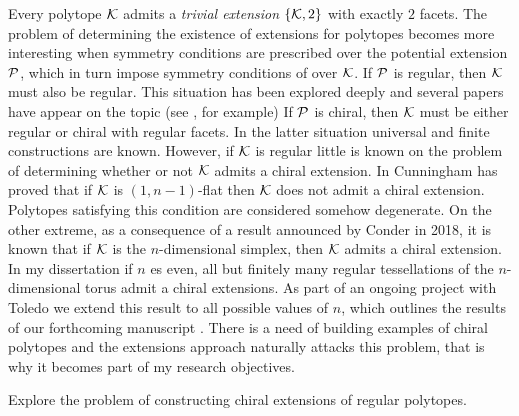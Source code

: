 \documentclass[a4paper,12pt,english]{article}
\begin{document}
Every polytope $\mathcal{K}$ admits a \emph{trivial extension} $\left\{ \mathcal{K}, 2 \right\} $ with exactly $2$ facets.
The problem of determining the existence of extensions for polytopes becomes more interesting when symmetry conditions are prescribed over the potential extension $\mathcal{P}$, which in turn impose symmetry conditions of over $\mathcal{K}$.
If $\mathcal{P}$ is regular, then $\mathcal{K}$ must also be regular.
This situation has been explored deeply and several papers have appear on the topic 
(see \cite{Pellicer2010_ExtensionsDuallyBipartite,Pellicer2009_ExtensionsRegularPolytopes,Schulte1985_ExtensionsRegularComplexes,Schulte1983_ArrangingRegularIncidence,Schulte1990_ClassAbstractPolytopes, Danzer1984_RegularIncidenceComplexes}, for example)
If $\mathcal{P}$ is chiral, then $\mathcal{K}$ must be either regular or chiral with regular facets.
In the latter situation universal \cite{SchulWeiss1995_FreeExtensionsChiral} and finite \cite{CunniPelli2014_ChiralExtensionsChiral,Montero2021_SchlaefliSymbolChiral} constructions are known. However, if $\mathcal{K}$ is regular little is known on the problem of determining whether or not $\mathcal{K}$ admits a chiral extension.
In \cite{Cunningham2017_NonFlatRegular} Cunningham has proved that if $\mathcal{K}$ is $(1,n-1)$-flat then $\mathcal{K}$ does not admit a chiral extension.
Polytopes satisfying this condition are considered somehow degenerate.
On the other extreme, as a consequence of a result announced by Conder in 2018, it is known that if $\mathcal{K}$ is the $n$-dimensional simplex, then $\mathcal{K}$ admits a chiral extension.
In my dissertation \cite{Montero2019_ChiralExtensionsToroids_PhDThesis} if $n$ es even, all but finitely many regular tessellations of the $n$-dimensional torus admit a chiral extensions.
As part of an ongoing project with Toledo we extend this result to all possible values of $n$, which outlines the results of our forthcoming manuscript \cite{MonteToled_ChiralExtensionsRegular_preprint}.
There is a need of building examples of chiral polytopes and the extensions approach naturally attacks this problem, that is why it becomes part of my research objectives.


\begin{obj}\label{obj:chiralExt}
  Explore the problem of constructing chiral extensions of regular polytopes.
\end{obj}
\end{document}
